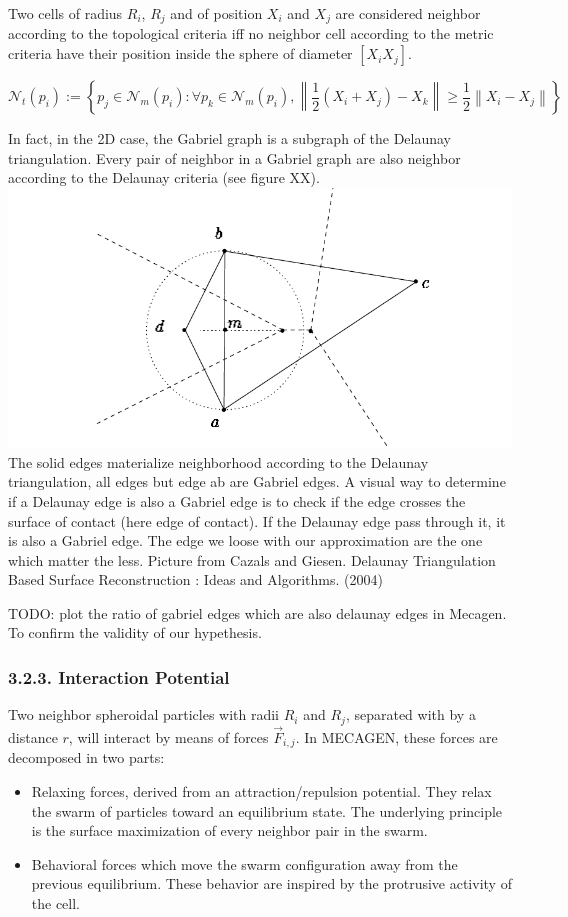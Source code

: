 Two cells of radius $R_i$, $R_j$ and of position $X_i$ and $X_j$ are considered neighbor according to the topological criteria iff no neighbor cell according to the metric criteria have their position inside the sphere of diameter $[X_i X_j]$.

$$\mathcal{N}_t (p_i) := \left \{  p_j \in  \mathcal{N}_m (p_i) : \forall p_k \in  \mathcal{N}_m (p_i), \left \| \frac{1}{2} ( X_i + X_j ) - X_k  \right \| \geq \frac{1}{2} \left \| X_i - X_j \right \|\right \} $$

In fact, in the 2D case, the Gabriel graph is a subgraph of the Delaunay triangulation. Every pair of neighbor in a Gabriel graph are also neighbor according to the Delaunay criteria (see figure XX). 
\includegraphics{../../images/MECAGEN/spatial_neighb/gabdelau.png}The solid edges materialize neighborhood according to the Delaunay triangulation, all edges but edge ab are Gabriel edges. A visual way to determine if a Delaunay edge is also a Gabriel edge is to check if the edge crosses the surface of contact (here edge of contact). If the Delaunay edge pass through it, it is also a Gabriel edge. The edge we loose with our approximation are the one which matter the less. Picture from Cazals and Giesen. Delaunay Triangulation Based Surface Reconstruction : Ideas and Algorithms. (2004)

TODO: plot the ratio of gabriel edges which are also delaunay edges in Mecagen. To confirm the validity of our hypethesis.

\subsubsection{3.2.3. Interaction Potential  }

Two neighbor spheroidal particles with radii $R_i$ and $R_j$, separated with by a distance $r$, will interact by means of forces $ \vec{F}_{i,j} $. In MECAGEN, these forces are decomposed in two parts: 
\begin{itemize}
	\item Relaxing forces, derived from an attraction/repulsion potential. They relax the swarm of particles toward an equilibrium state. The underlying principle is the surface maximization of every neighbor pair in the swarm.
	\item Behavioral forces which move the swarm configuration away from the previous equilibrium. These behavior are inspired by the protrusive activity of the cell.
\end{itemize}

